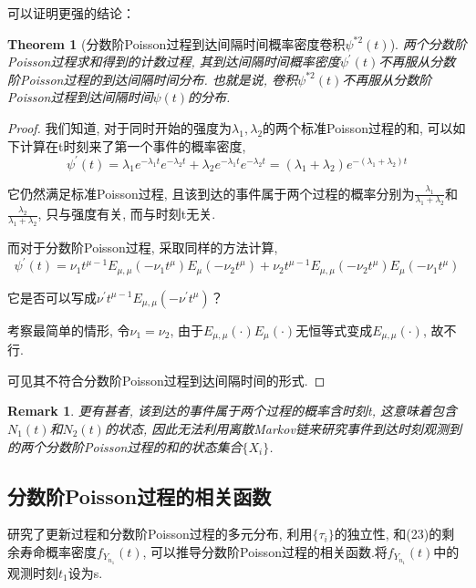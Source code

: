 \documentclass[a4paper, 12pt]{ctexart}
\newtheorem{theorem}{Theorem}[section]
\newtheorem*{remark}{Remark}
\begin{document}
可以证明更强的结论：
\begin{theorem}[分数阶Poisson过程到达间隔时间概率密度卷积$\psi ^{\ast 2}(t)$]
两个分数阶Poisson过程求和得到的计数过程,   其到达间隔时间概率密度$\psi ^{\prime} (t)$不再服从分数阶Poisson过程的到达间隔时间分布. 也就是说,   卷积$\psi ^{\ast 2}(t)$不再服从分数阶Poisson过程到达间隔时间$\psi (t)$的分布. 
\end{theorem}
\begin{proof}
我们知道,   对于同时开始的强度为$\lambda _1,  \lambda _2$的两个标准Poisson过程的和,   可以如下计算在t时刻来了第一个事件的概率密度,   
\begin{equation}
\psi ^{\prime}(t) = \lambda _1 e^{-\lambda _1 t} e^{-\lambda _2 t}+\lambda _2 e^{-\lambda _1 t}e^{-\lambda _2 t}=(\lambda _1 +\lambda _2)e^{-(\lambda _1+\lambda _2)t}
\end{equation}

它仍然满足标准Poisson过程,   且该到达的事件属于两个过程的概率分别为$\frac{\lambda _1}{\lambda _1 +\lambda _2}$和$\frac{\lambda _2}{\lambda _1 +\lambda _2}$,  只与强度有关,   而与时刻t无关. 

而对于分数阶Poisson过程,   采取同样的方法计算,   
\begin{equation}
\psi ^{\prime}(t) = \nu _1 t^{\mu -1}E_{\mu ,  \mu}(-\nu _1 t^{\mu})E_{\mu}(-\nu _2 t^{\mu})+\nu _2 t^{\mu -1}E_{\mu ,  \mu}(-\nu _2 t^{\mu})E_{\mu}(-\nu _1 t^{\mu})
\end{equation}

它是否可以写成$\nu ^{\prime} t^{\mu -1}E_{\mu ,  \mu}(-\nu ^{\prime} t^{\mu})$？

考察最简单的情形,   令$\nu _1 =\nu _2$,   由于$E_{\mu ,  \mu}(\cdot)E_{\mu}(\cdot)$无恒等式变成$E_{\mu ,  \mu}(\cdot)$,   故不行. 


可见其不符合分数阶Poisson过程到达间隔时间的形式. 
\end{proof}
\begin{remark}
更有甚者,   该到达的事件属于两个过程的概率含时刻t,   这意味着包含$N_1 (t)$和$N_2 (t)$的状态,   因此无法利用离散Markov链来研究事件到达时刻观测到的两个分数阶Poisson过程的和的状态集合$\{X_i\}$. 
\end{remark}

\subsection{分数阶Poisson过程的相关函数}
\cite{4}研究了更新过程和分数阶Poisson过程的多元分布, 利用$\{\tau _i\}$的独立性, 和\cite{4}(23)的剩余寿命概率密度$f_{Y_{n_1}}(t)$, 可以推导分数阶Poisson过程的相关函数.将$f_{Y_{n_1}}(t)$中的观测时刻$t_1$设为s.
\end{document}

